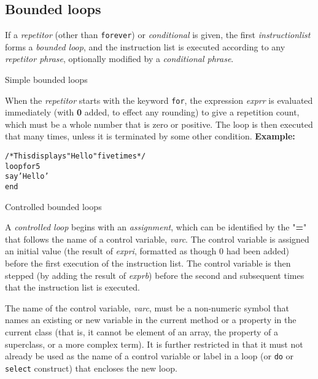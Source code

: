 \subsection{Bounded loops}
 If a \emph{repetitor} (other than \texttt{forever}) or
\emph{conditional} is given, the first \emph{instructionlist}
forms a \emph{bounded loop}, and the instruction list is executed
according to any \emph{repetitor phrase}, optionally modified by a
\emph{conditional phrase}.
\begin{description}
\item{Simple bounded loops}

When the \emph{repetitor} starts with the keyword \texttt{for},
the expression \emph{exprr} is evaluated immediately
(with \textbf{0} added, to effect any rounding) to give a repetition
count, which must be a whole number that is zero or positive.
The loop is then executed that many times, unless it is terminated by
some other condition.
 \textbf{Example:}
\begin{alltt}
/* This displays "Hello" five times */
loop for 5
  say 'Hello'
  end
\end{alltt}
\item{Controlled bounded loops}

A \emph{controlled loop} begins with an \emph{assignment},
which can be identified by the "\textbf{=}" that follows the name
of a control variable, \emph{varc}.
The control variable is assigned an initial value (the result of
\emph{expri}, formatted as though 0 had been added)
before the first execution of the instruction list.
The control variable is then stepped (by adding the result of
\emph{exprb}) before the second and subsequent times that the
instruction list is executed.
 
The name of the control variable, \emph{varc}, must be a non-numeric
symbol that names an existing or new variable in the current method or a
property in the current class (that is, it cannot be element of an
array, the property of a superclass, or a more complex term).  It is
further restricted in that it must not already be used as the name of a
control variable or label in a loop (or \texttt{do} or \texttt{select}
construct) that encloses the new loop.
 

\end{description}
